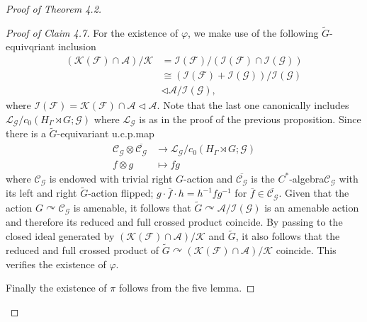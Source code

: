 \documentclass{amsart}
\theoremstyle{definition}
\newcommand{\action}{\curvearrowright}
\newcommand{\Cstaralg}{$C^{\ast}$-algebra\xspace}
\newcommand{\longto}{\longrightarrow}
\begin{document}
\begin{proof}[Proof of Theorem 4.2]
\begin{proof}[Proof of Claim 4.7]
For the existence of $\varphi$, we make use of the following 
$\tilde{G}$-equivqriant inclusion 
\begin{align}
(\mathcal{K}(\mathcal{F})\cap \mathscr{A}) / \mathcal{K}
&= \mathcal{I}(\mathcal{F}) / (\mathcal{I}(\mathcal{F})\cap \mathcal{I}(\mathcal{G})) \\
&\cong (\mathcal{I}(\mathcal{F})+\mathcal{I}(\mathcal{G})) / \mathcal{I}(\mathcal{G}) \\
&\lhd \mathscr{A} / \mathcal{I}(\mathcal{G}), 
\end{align}
where $\mathcal{I}(\mathcal{F})=\mathcal{K}(\mathcal{F})\cap \mathscr{A}\lhd \mathscr{A}$. Note that the last one canonically includes 
$\mathcal{L}_{\mathcal{G}} / c_0(H_{\Gamma}\rtimes G; \mathcal{G})$ where $\mathcal{L}_{\mathcal{G}}$ is as in the proof of the previous proposition. 
Since there is a $\tilde{G}$-equivariant u.c.p.\@ map
\begin{align}
\mathcal{C}_{\mathcal{G}} \otimes \overline{\mathcal{C}_{\mathcal{G}}}
&\longto \mathcal{L}_{\mathcal{G}}/ c_0(H_{\Gamma}\rtimes G; \mathcal{G}) \\
f\otimes g &\longmapsto fg
\end{align}
where $\mathcal{C}_{\mathcal{G}}$ is endowed with trivial right $G$-action and $\overline{\mathcal{C}_{\mathcal{G}}}$ is the \Cstaralg $\mathcal{C}_{\mathcal{G}}$ with its left and right $\tilde{G}$-action flipped; $g\cdot \overline{f} \cdot h = h^{-1}fg^{-1}$ for $\overline{f}\in \overline{\mathcal{C}_{\mathcal{G}}}$. 
Given that the action $G\action \mathcal{C}_{\mathcal{G}}$ is amenable, it follows that $\tilde{G}\action \mathscr{A} / \mathcal{I}(\mathcal{G})$
is an amenable action
and therefore its reduced and full crossed product coincide. 
By passing to the closed ideal generated by $(\mathcal{K}(\mathcal{F})\cap \mathscr{A}) / \mathcal{K}$ and $\tilde{G}$, it also follows that the reduced and full crossed product of 
$\tilde{G}\action (\mathcal{K}(\mathcal{F})\cap \mathscr{A}) / \mathcal{K}$
coincide. 
This verifies the existence of $\varphi$. 

Finally the existence of $\pi$ follows from the five lemma. 
\end{proof}






\end{proof}
\end{document}
